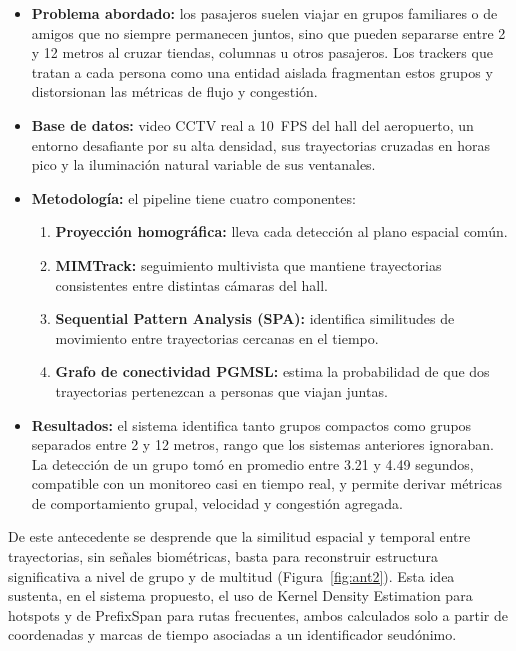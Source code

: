 \documentclass[12pt,a4paper]{article}
\begin{document}
\begin{itemize}
    \item \textbf{Problema abordado:} los pasajeros suelen viajar en
    grupos familiares o de amigos que no siempre permanecen juntos, sino
    que pueden separarse entre 2 y 12 metros al cruzar tiendas, columnas
    u otros pasajeros. Los trackers que tratan a cada persona como una
    entidad aislada fragmentan estos grupos y distorsionan las métricas
    de flujo y congestión.

    \item \textbf{Base de datos:} video CCTV real a 10~FPS del hall del
    aeropuerto, un entorno desafiante por su alta densidad, sus
    trayectorias cruzadas en horas pico y la iluminación natural variable
    de sus ventanales.

    \item \textbf{Metodología:} el pipeline tiene cuatro componentes:
    \begin{enumerate}
        \item \textbf{Proyección homográfica:} lleva cada detección al
        plano espacial común.
        \item \textbf{MIMTrack:} seguimiento multivista que mantiene
        trayectorias consistentes entre distintas cámaras del hall.
        \item \textbf{Sequential Pattern Analysis (SPA):} identifica
        similitudes de movimiento entre trayectorias cercanas en el
        tiempo.
        \item \textbf{Grafo de conectividad PGMSL:} estima la
        probabilidad de que dos trayectorias pertenezcan a personas que
        viajan juntas.
    \end{enumerate}

    \item \textbf{Resultados:} el sistema identifica tanto grupos
    compactos como grupos separados entre 2 y 12 metros, rango que los
    sistemas anteriores ignoraban. La detección de un grupo tomó en
    promedio entre 3.21 y 4.49 segundos, compatible con un monitoreo casi
    en tiempo real, y permite derivar métricas de comportamiento grupal,
    velocidad y congestión agregada.
\end{itemize}

De este antecedente se desprende que la similitud espacial y temporal
entre trayectorias, sin señales biométricas, basta para reconstruir
estructura significativa a nivel de grupo y de multitud
(Figura~\ref{fig:ant2}). Esta idea
sustenta, en el sistema propuesto, el uso de Kernel Density Estimation
para hotspots y de PrefixSpan para rutas frecuentes, ambos calculados
solo a partir de coordenadas y marcas de tiempo asociadas a un
identificador seudónimo.
\end{document}
